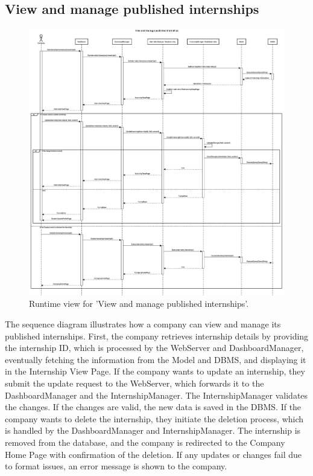 \subsection{View and manage published internships}
\begin{figure}[H]
    \begin{center}
        \includegraphics[width=0.8\linewidth]{DD/LaTeX/Images/RuntimeView/ManageInternships.png}
        \caption{Runtime view for 'View and manage published internships'.}
        \label{fig:runtime_ManageInternships}%
    \end{center}
\end{figure}

The sequence diagram illustrates how a company can view and manage its published internships. First, the company retrieves internship details by providing the internship ID, which is processed by the WebServer and DashboardManager, eventually fetching the information from the Model and DBMS, and displaying it in the Internship View Page. If the company wants to update an internship, they submit the update request to the WebServer, which forwards it to the DashboardManager and the InternshipManager. The InternshipManager validates the changes. If the changes are valid, the new data is saved in the DBMS. If the company wants to delete the internship, they initiate the deletion process, which is handled by the DashboardManager and InternshipManager. The internship is removed from the database, and the company is redirected to the Company Home Page with confirmation of the deletion. If any updates or changes fail due to format issues, an error message is shown to the company.

